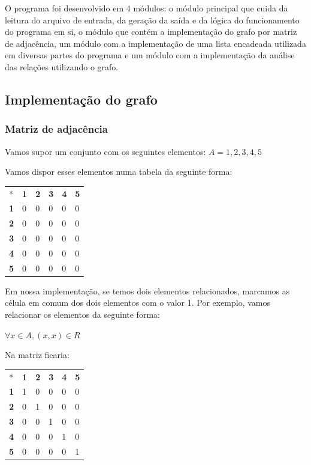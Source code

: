 \documentclass[12pt]{article}
\begin{document}
O programa foi desenvolvido em 4 módulos: o módulo principal que cuida da leitura
do arquivo de entrada, da geração da saída e da lógica do funcionamento do programa
em si, o módulo que contém a implementação do grafo por matriz de adjacência, um
módulo com a implementação de uma lista encadeada utilizada em diversas partes
do programa e um módulo com a implementação da análise das relações utilizando o grafo.

\subsection{Implementação do grafo}

\subsubsection{Matriz de adjacência}

Vamos supor um conjunto com os seguintes elementos: $A = {1,2,3,4,5}$

Vamos dispor esses elementos numa tabela da seguinte forma:

\begin{center}
\begin{tabular}{llllll}
* & \textbf{1} & \textbf{2} & \textbf{3} & \textbf{4} & \textbf{5}\\
\textbf{1} & 0 & 0 & 0 & 0 & 0\\
\textbf{2} & 0 & 0 & 0 & 0 & 0\\
\textbf{3} & 0 & 0 & 0 & 0 & 0\\
\textbf{4} & 0 & 0 & 0 & 0 & 0\\
\textbf{5} & 0 & 0 & 0 & 0 & 0
\end{tabular}
\end{center}

Em nossa implementação, se temos dois elementos relacionados, marcamos as célula em 
comum dos dois elementos com o valor 1. Por exemplo, vamos relacionar os elementos da 
seguinte forma:

$\forall x \in A, (x, x) \in R$

Na matriz ficaria:

\begin{center}
\begin{tabular}{llllll}
* & \textbf{1} & \textbf{2} & \textbf{3} & \textbf{4} & \textbf{5}\\
\textbf{1} & 1 & 0 & 0 & 0 & 0\\
\textbf{2} & 0 & 1 & 0 & 0 & 0\\
\textbf{3} & 0 & 0 & 1 & 0 & 0\\
\textbf{4} & 0 & 0 & 0 & 1 & 0\\
\textbf{5} & 0 & 0 & 0 & 0 & 1
\end{tabular}
\end{center}
\end{document}

